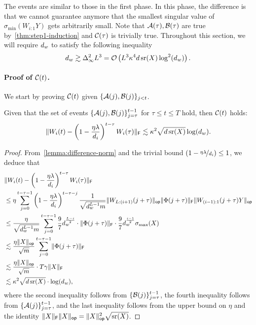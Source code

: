 The events are similar to those in the first phase. In this phase, the difference is that we cannot guarantee anymore that the smallest singular value of $\sigma_{\min}(W_{i:1}Y)$ gets arbitrarily small. 
Note that $\mathcal{A}(\tau), \mathcal{B}(\tau)$ are true by~\cref{thm:step1-induction} and $\mathcal{C}(\tau)$ is trivially true.
Throughout this section, we will require $d_{w}$ to satisfy the following inequality
\begin{equation}
  d_{w} \gtrsim \Delta_{\infty}^2 L^3 = \mathcal{O}\left(L^3 \kappa^4 d \operatorname{\mathrm{sr}}(X) \log^2(d_{w}) \right).
  \label{eq:dhid-lb-step-2}
\end{equation}

\paragraph{Proof of $\mathcal{C}(t)$.}
We start by proving $\mathcal{C}(t)$ given $\{\mathcal{A}(j), \mathcal{B}(j)\}_{j < t}$.
\begin{lemma}
Given that the set  of events
$\{\mathcal{A}(j), \mathcal{B}(j)\}_{j = \tau}^{t-1}$ for $\tau \leq t \leq T$ hold, then $\mathcal{C}(t)$ holds:
\[
        \lVert W_{i}(t) - \left(1 - \frac{\eta \lambda}{d_i}\right)^{t - \tau} W_{i}(\tau)\rVert_{\mathsf{F}}
        \lesssim \kappa^2 \sqrt{d \operatorname{\mathrm{sr}}(X)} \log(d_{w})
      .
\]
\end{lemma}
\begin{proof}
  From~\cref{lemma:difference-norm} and the trivial bound $(1 - \nicefrac{\eta \lambda}{d_i}) \leq 1$, we deduce that
  \begin{align*}
    & \lVert W_{i}(t) - \left(1 - \frac{\eta \lambda}{d_i}\right)^{t - \tau}
    W_{i}(\tau)\rVert_{\mathsf{F}} \\
    &\leq
    \eta \sum_{j = 0}^{t - \tau - 1}
    \left(1 - \frac{\eta \lambda}{d_i}\right)^{t - \tau - j}
    \frac{1}{\sqrt{d_{w}^{L - 1} m}}
    \lVert W_{L:(i+1)}(j + \tau)\rVert_{\mathsf{op}}
    \lVert\Phi(j + \tau)\rVert_{\mathsf{F}} \lVert W_{(i-1):1}(j + \tau) Y\rVert_{\mathsf{op}} \\
    &\leq
    \frac{\eta}{\sqrt{d_{w}^{L-1} m}}
    \sum_{j = 0}^{t - \tau - 1}
    \frac{9}{7} d_{w}^{\frac{L - i}{2}}
    \cdot \lVert\Phi(j + \tau)\rVert_{\mathsf{F}} \cdot
    \frac{9}{7} d_{w}^{\frac{i - 1}{2}} \sigma_{\max}(X) \\
    &\lesssim
    \frac{ \eta \lVert X\rVert_{\mathsf{op}}}{\sqrt{m}}
    \sum_{j = 0}^{t - \tau - 1}
    \lVert\Phi(j + \tau)\rVert_{\mathsf{F}} \\
    &\lesssim
    \frac{ \eta \lVert X\rVert_{\mathsf{op}}}{ \sqrt{m}}
    \cdot T\gamma\lVert X\rVert_{\mathsf{F}}  \\
    &\lesssim \kappa^2 \sqrt{d \operatorname{\mathrm{sr}}(X)} \cdot \log(d_{w}),
  \end{align*}
  where the second inequality follows from $\{\mathcal{B}(j)\}_{j = \tau}^{t-1}$, the fourth inequality
  follows from $\{\mathcal{A}(j)\}_{j = \tau}^{t-1}$, and the last inequality follows from the
  upper bound on $\eta$ and the identity $\lVert X\rVert_{\mathsf{F}} \lVert X\rVert_{\mathsf{op}} = \lVert X\rVert_{\mathsf{op}}^2 \sqrt{\operatorname{\mathrm{sr}}(X)}$.
\end{proof}

